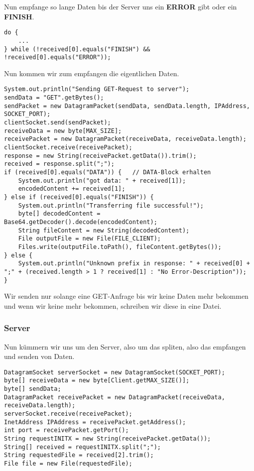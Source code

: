 Nun empfange so lange Daten bis der Server uns ein \textbf{ERROR} gibt oder ein \textbf{FINISH}. 

\begin{lstlisting}
do {
	...
} while (!received[0].equals("FINISH") && !received[0].equals("ERROR"));
\end{lstlisting}

Nun kommen wir zum empfangen die eigentlichen Daten. 

\begin{lstlisting}
System.out.println("Sending GET-Request to server");
sendData = "GET".getBytes();
sendPacket = new DatagramPacket(sendData, sendData.length, IPAddress, SOCKET_PORT);
clientSocket.send(sendPacket);
receiveData = new byte[MAX_SIZE];
receivePacket = new DatagramPacket(receiveData, receiveData.length);
clientSocket.receive(receivePacket);
response = new String(receivePacket.getData()).trim();
received = response.split(";");
if (received[0].equals("DATA")) {	// DATA-Block erhalten
	System.out.println("got data: " + received[1]);
	encodedContent += received[1];
} else if (received[0].equals("FINISH")) {
	System.out.println("Transferring file successful!");
	byte[] decodedContent = Base64.getDecoder().decode(encodedContent);
	String fileContent = new String(decodedContent);
	File outputFile = new File(FILE_CLIENT);
	Files.write(outputFile.toPath(), fileContent.getBytes());
} else {
	System.out.println("Unknown prefix in response: " + received[0] + ";" + (received.length > 1 ? received[1] : "No Error-Description"));
}
\end{lstlisting}

Wir senden nur solange eine GET-Anfrage bis wir keine Daten mehr bekommen und wenn wir keine mehr bekommen, schreiben wir diese in eine Datei.

\subsubsection{Server}
Nun kümmern wir uns um den Server, also um das spliten, also das empfangen und senden von Daten.

\begin{lstlisting}
DatagramSocket serverSocket = new DatagramSocket(SOCKET_PORT);
byte[] receiveData = new byte[Client.getMAX_SIZE()];
byte[] sendData;
DatagramPacket receivePacket = new DatagramPacket(receiveData, receiveData.length);
serverSocket.receive(receivePacket);
InetAddress IPAddress = receivePacket.getAddress();
int port = receivePacket.getPort();
String requestINITX = new String(receivePacket.getData());
String[] received = requestINITX.split(";");
String requestedFile = received[2].trim();
File file = new File(requestedFile);
\end{lstlisting}

